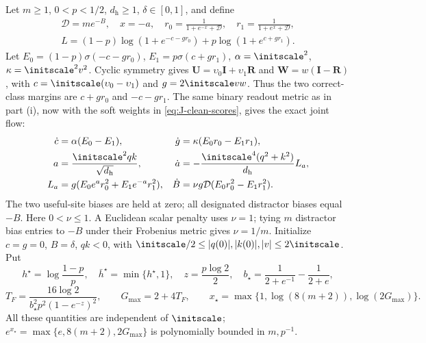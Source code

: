 Let $m\ge1$, $0<p<1/2$, $d_{\mathrm h}\ge1$, $\delta\in[0,1]$, and define
\[
 \begin{gathered}
 \mathcal D=me^{-B},\quad x=-a,\quad
 r_0=\frac1{1+e^{-x}+\mathcal D},\quad r_1=\frac1{1+e^x+\mathcal D},\\
 L=(1-p)\log(1+e^{-c-gr_0})+p\log(1+e^{c+gr_1}).
 \end{gathered}
\]
Let $E_0=(1-p)\sigma(-c-gr_0)$, $E_1=p\sigma(c+gr_1)$, $\alpha=\initscale^2$, $\kappa=\initscale^2v^2$.
Cyclic symmetry gives $\mathbf U=\upsilon_0\mathbf I+\upsilon_1\mathbf R$ and $\mathbf W=w(\mathbf I-\mathbf R)$, with
$c=\initscale(\upsilon_0-\upsilon_1)$ and $g=2\initscale vw$. Thus the two correct-class margins are $c+gr_0$ and $-c-gr_1$.
The same binary readout metric as in part (i), now with the soft weights in \cref{eq:J-clean-scores}, gives the exact joint flow:
\begin{align*}
 \dot c&=\alpha(E_0-E_1),&
 \dot g&=\kappa(E_0r_0-E_1r_1),\\
 a&=\frac{\initscale^2qk}{\sqrt{d_{\mathrm h}}},&
 \dot a&=-\frac{\initscale^4(q^2+k^2)}{d_{\mathrm h}}L_a,\\
 L_a&=g(E_0e^a r_0^2+E_1e^{-a}r_1^2),&
 \dot B&=\nu g\mathcal D(E_0r_0^2-E_1r_1^2).
\end{align*}
The two useful-site biases are held at zero; all designated distractor biases equal $-B$.
Here $0<\nu\le1$. A Euclidean scalar penalty uses $\nu=1$; tying $m$ distractor bias entries to $-B$ under their Frobenius metric gives $\nu=1/m$.
Initialize $c=g=0$, $B=\delta$, $qk<0$, with
$\initscale/2\le |q(0)|,|k(0)|,|v|\le2\initscale$.
Put
\begin{equation}
 h^\star=\log\frac{1-p}{p},\quad \bar h^\star=\min\{h^\star,1\},\quad
 z=\frac{p\log2}{2},\quad
 b_\star=\frac1{2+e^{-1}}-\frac1{2+e},
\end{equation}
\begin{equation}
 T_F=\frac{16\log2}{b_\star^2p^2(1-e^{-z})^2},\qquad
 G_{\max}=2+4T_F,\qquad x_\star=\max\{1,\log(8(m+2)),\log(2G_{\max})\}.
 \label{eq:CR-constants}
\end{equation}
All these quantities are independent of $\initscale$; $e^{x_\star}=\max\{e,8(m+2),2G_{\max}\}$ is polynomially bounded in $m,p^{-1}$.

